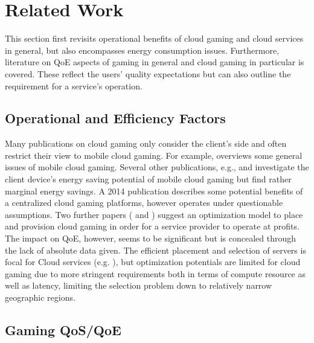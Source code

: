 \section{Related Work}
\label{sec:relatedwork}

This section first revisits operational benefits of cloud gaming and cloud services in general, but also encompasses energy consumption issues.  Furthermore, literature on \gls{QoE} aspects of gaming in general and cloud gaming in particular is covered. These reflect the users' quality expectations but can also outline the requirement for a service's operation.


\subsection{Operational and Efficiency Factors}

Many publications on cloud gaming only consider the client's side and often restrict their view to mobile cloud gaming. For example, \cite{Soliman2013} overviews some general issues of mobile cloud gaming. Several other publications, e.g., \cite{6924295} and \cite{Huang:2014:MCP:2755535.2755542} investigate the client device's energy saving potential of mobile cloud gaming but find rather marginal energy savings. A 2014 publication \cite{6882299} describes some potential benefits of a centralized cloud gaming platforms, however operates under questionable assumptions. Two further papers (\cite{6853364} and \cite{6365107}) suggest an optimization model to place and provision cloud gaming  in order for a service provider to operate at profits. The impact on \gls{QoE}, however, seems to be significant but is concealed through the lack of absolute data given. The efficient placement and selection of servers is focal for Cloud services (e.g. \cite{6740249}), but optimization potentials are limited for cloud gaming due to more stringent requirements both in terms of compute resource as well as latency, limiting the selection problem down to relatively narrow geographic regions.


\subsection{Gaming QoS/QoE}

